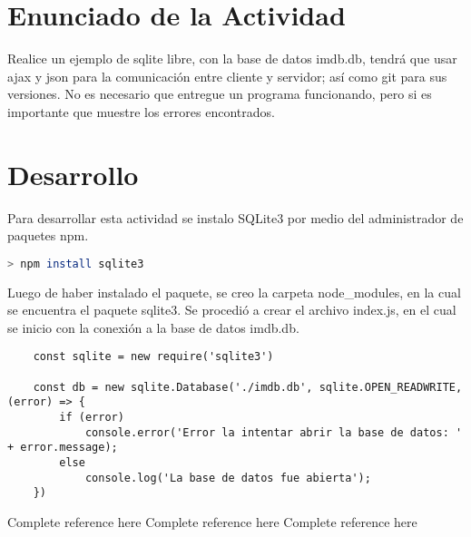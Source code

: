 \section{Enunciado de la Actividad}

Realice un ejemplo de sqlite libre, con la base de datos imdb.db, tendrá que usar ajax y json para la comunicación entre cliente y servidor; así como git para sus versiones. No es necesario que entregue un programa funcionando, pero si es importante que muestre los errores encontrados.

\section{Desarrollo}

Para desarrollar esta actividad se instalo SQLite3 por medio del administrador de paquetes npm. 
\begin{lstlisting}[language=bash]
    > npm install sqlite3
\end{lstlisting}

Luego de haber instalado el paquete, se creo la carpeta node\_modules, en la cual se encuentra el paquete sqlite3. Se procedió a crear el archivo index.js, en el cual se inicio con la conexión a la base de datos imdb.db.\\

\begin{lstlisting}
    const sqlite = new require('sqlite3')

    const db = new sqlite.Database('./imdb.db', sqlite.OPEN_READWRITE, (error) => {
        if (error)
            console.error('Error la intentar abrir la base de datos: ' + error.message);
        else 
            console.log('La base de datos fue abierta');
    })
\end{lstlisting}







\clearpage
\begin{thebibliography}{X}
     Complete reference here
     Complete reference here
     Complete reference here
\end{thebibliography}